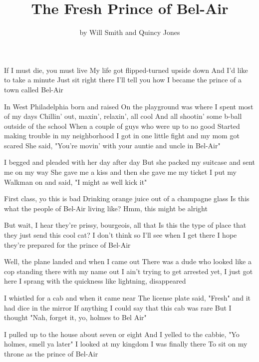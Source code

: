 \documentclass{article}
\title{The Fresh Prince of Bel-Air}
\author{by Will Smith and Quincy Jones}
\begin{document}
\maketitle

If I must die, you must live
My life got flipped-turned upside down
And I'd like to take a minute
Just sit right there
I'll tell you how I became the prince of a town called Bel-Air

In West Philadelphia born and raised
On the playground was where I spent most of my days
Chillin' out, maxin', relaxin', all cool
And all shootin' some b-ball outside of the school
When a couple of guys who were up to no good
Started making trouble in my neighborhood
I got in one little fight and my mom got scared
She said, "You're movin' with your auntie and uncle in Bel-Air"

I begged and pleaded with her day after day
But she packed my suitcase and sent me on my way
She gave me a kiss and then she gave me my ticket
I put my Walkman on and said, "I might as well kick it"

First class, yo this is bad
Drinking orange juice out of a champagne glass
Is this what the people of Bel-Air living like?
Hmm, this might be alright

But wait, I hear they're prissy, bourgeois, all that
Is this the type of place that they just send this cool cat?
I don't think so
I'll see when I get there
I hope they're prepared for the prince of Bel-Air

Well, the plane landed and when I came out
There was a dude who looked like a cop standing there with my name out
I ain't trying to get arrested yet, I just got here
I sprang with the quickness like lightning, disappeared

I whistled for a cab and when it came near
The license plate said, "Fresh" and it had dice in the mirror
If anything I could say that this cab was rare
But I thought "Nah, forget it, yo, holmes to Bel Air"

I pulled up to the house about seven or eight
And I yelled to the cabbie, "Yo holmes, smell ya later"
I looked at my kingdom
I was finally there
To sit on my throne as the prince of Bel-Air
\end{document}
